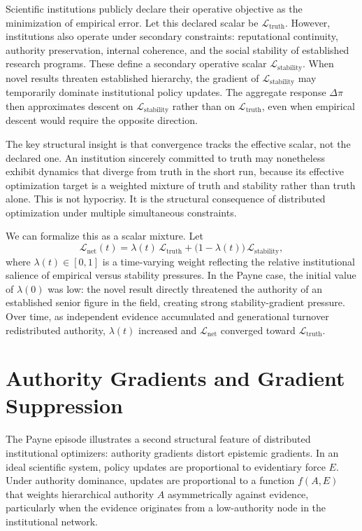 \documentclass[12pt, oneside]{book}
\theoremstyle{plain}
\theoremstyle{definition}
\theoremstyle{remark}
\theoremstyle{definition}
\begin{document}
Scientific institutions publicly declare their operative objective as the minimization
of empirical error. Let this declared scalar be $\mathcal{L}_{\text{truth}}$. However,
institutions also operate under secondary constraints: reputational continuity,
authority preservation, internal coherence, and the social stability of established
research programs. These define a secondary operative scalar $\mathcal{L}_{\text{stability}}$.
When novel results threaten established hierarchy, the gradient of
$\mathcal{L}_{\text{stability}}$ may temporarily dominate institutional policy
updates. The aggregate response $\Delta\pi$ then approximates descent on
$\mathcal{L}_{\text{stability}}$ rather than on $\mathcal{L}_{\text{truth}}$, even
when empirical descent would require the opposite direction.

The key structural insight is that convergence tracks the effective scalar, not the
declared one. An institution sincerely committed to truth may nonetheless exhibit
dynamics that diverge from truth in the short run, because its effective optimization
target is a weighted mixture of truth and stability rather than truth alone. This is
not hypocrisy. It is the structural consequence of distributed optimization under
multiple simultaneous constraints.

We can formalize this as a scalar mixture. Let
\[
\mathcal{L}_{\text{net}}(t) = \lambda(t)\,\mathcal{L}_{\text{truth}}
+ \bigl(1 - \lambda(t)\bigr)\,\mathcal{L}_{\text{stability}},
\]
where $\lambda(t) \in [0,1]$ is a time-varying weight reflecting the relative
institutional salience of empirical versus stability pressures. In the Payne case,
the initial value of $\lambda(0)$ was low: the novel result directly threatened
the authority of an established senior figure in the field, creating strong
stability-gradient pressure. Over time, as independent evidence accumulated and
generational turnover redistributed authority, $\lambda(t)$ increased and
$\mathcal{L}_{\text{net}}$ converged toward $\mathcal{L}_{\text{truth}}$.

\section{Authority Gradients and Gradient Suppression}

The Payne episode illustrates a second structural feature of distributed institutional
optimizers: authority gradients distort epistemic gradients. In an ideal scientific
system, policy updates are proportional to evidentiary force $E$. Under authority
dominance, updates are proportional to a function $f(A, E)$ that weights
hierarchical authority $A$ asymmetrically against evidence, particularly when the
evidence originates from a low-authority node in the institutional network.
\end{document}
